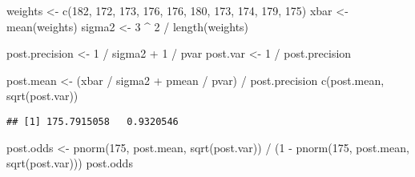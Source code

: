 \documentclass[
]{book}
\newenvironment{Shaded}{\begin{snugshade}}{\end{snugshade}}
\newcommand{\DecValTok}[1]{\textcolor[rgb]{0.00,0.00,0.81}{#1}}
\newcommand{\FunctionTok}[1]{\textcolor[rgb]{0.00,0.00,0.00}{#1}}
\newcommand{\NormalTok}[1]{#1}
\newcommand{\OtherTok}[1]{\textcolor[rgb]{0.56,0.35,0.01}{#1}}
\newcommand{\SpecialCharTok}[1]{\textcolor[rgb]{0.00,0.00,0.00}{#1}}
\begin{document}
\begin{Shaded}
\begin{Highlighting}[]
\NormalTok{weights }\OtherTok{\textless{}{-}} \FunctionTok{c}\NormalTok{(}\DecValTok{182}\NormalTok{, }\DecValTok{172}\NormalTok{, }\DecValTok{173}\NormalTok{, }\DecValTok{176}\NormalTok{, }\DecValTok{176}\NormalTok{, }\DecValTok{180}\NormalTok{,}
             \DecValTok{173}\NormalTok{, }\DecValTok{174}\NormalTok{, }\DecValTok{179}\NormalTok{, }\DecValTok{175}\NormalTok{)}
\NormalTok{xbar }\OtherTok{\textless{}{-}} \FunctionTok{mean}\NormalTok{(weights)}
\NormalTok{sigma2 }\OtherTok{\textless{}{-}} \DecValTok{3} \SpecialCharTok{\^{}} \DecValTok{2} \SpecialCharTok{/} \FunctionTok{length}\NormalTok{(weights)}
\end{Highlighting}
\end{Shaded}

\begin{Shaded}
\begin{Highlighting}[]
\NormalTok{post.precision }\OtherTok{\textless{}{-}} \DecValTok{1} \SpecialCharTok{/}\NormalTok{ sigma2 }\SpecialCharTok{+} \DecValTok{1} \SpecialCharTok{/}\NormalTok{ pvar}
\NormalTok{post.var }\OtherTok{\textless{}{-}} \DecValTok{1} \SpecialCharTok{/}\NormalTok{ post.precision}
\end{Highlighting}
\end{Shaded}

\begin{Shaded}
\begin{Highlighting}[]
\NormalTok{post.mean }\OtherTok{\textless{}{-}}\NormalTok{ (xbar }\SpecialCharTok{/}\NormalTok{ sigma2 }\SpecialCharTok{+}\NormalTok{ pmean }\SpecialCharTok{/}\NormalTok{ pvar) }\SpecialCharTok{/} 
\NormalTok{          post.precision}
\FunctionTok{c}\NormalTok{(post.mean, }\FunctionTok{sqrt}\NormalTok{(post.var))}
\end{Highlighting}
\end{Shaded}

\begin{verbatim}
## [1] 175.7915058   0.9320546
\end{verbatim}

\begin{Shaded}
\begin{Highlighting}[]
\NormalTok{post.odds }\OtherTok{\textless{}{-}} \FunctionTok{pnorm}\NormalTok{(}\DecValTok{175}\NormalTok{, post.mean, }
                   \FunctionTok{sqrt}\NormalTok{(post.var)) }\SpecialCharTok{/}
\NormalTok{           (}\DecValTok{1} \SpecialCharTok{{-}} \FunctionTok{pnorm}\NormalTok{(}\DecValTok{175}\NormalTok{, post.mean,}
                   \FunctionTok{sqrt}\NormalTok{(post.var)))}
\NormalTok{post.odds}
\end{Highlighting}
\end{Shaded}
\end{document}
